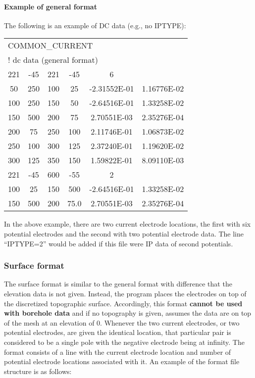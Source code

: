 \paragraph{Example of general format} 

The following is an example of DC data (e.g., no IPTYPE):

\begin{fileExample}
\begin{tabular}{|cccccc|}
\hline
\multicolumn{6}{|l|}{COMMON\_CURRENT} \\
\multicolumn{6}{|l|}{! dc data (general format) } \\
221 & -45 &  221  & -45  &  6 & \\
50 &  250 &  100  & 25  & -2.31552E-01 &  1.16776E-02 \\
100 & 250  & 150  & 50 &  -2.64516E-01 &  1.33258E-02 \\
150 & 500  & 200 & 75  &  2.70551E-03 &  2.35276E-04 \\
200 & 75 &  250  &  100 & 2.11746E-01 & 1.06873E-02 \\
250 & 100 &  300 & 125 &  2.37240E-01 &  1.19620E-02 \\
300 & 125 &  350 & 150  &  1.59822E-01 &  8.09110E-03 \\
221 & -45 &  600 & -55 &  2 & \\
100 &  25 &  150 &  500  & -2.64516E-01 & 1.33258E-02 \\
150 &  500  & 200 &  75.0 &  2.70551E-03 & 2.35276E-04 \\
\hline
\end{tabular}
\end{fileExample}
%
In the above example, there are two current electrode locations, the first with six potential electrodes and the second with two potential electrode data. The line ``IPTYPE=2'' would be added if this file were IP data of second potentials. 

\subsubsection*{Surface format}
The surface format is similar to the general format with difference that the elevation data is not given. Instead, the program places the electrodes on top of the discretized topographic surface. Accordingly, this format \textbf{cannot be used with borehole data} and if no topography is given, assumes the data are on top of the mesh at an elevation of 0. Whenever the two current electrodes, or two potential electrodes, are given the identical location, that particular pair is considered to be a single pole with the negative electrode being at infinity. The format consists of a line with the current electrode location and number of potential electrode locations associated with it. An example of the  format file structure is as follows:

